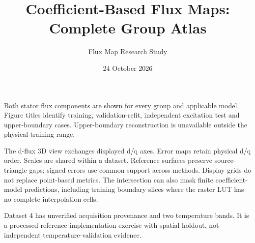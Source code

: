 \documentclass[11pt,a4paper]{article}
\title{Coefficient-Based Flux Maps: Complete Group Atlas}
\author{Flux Map Research Study}\date{24 October 2026}
\begin{document}
\maketitle
Both stator flux components are shown for every group and applicable model.
Figure titles identify training, validation-refit, independent excitation test and upper-boundary cases.
Upper-boundary reconstruction is unavailable outside the physical training range.
\par\medskip
The d-flux 3D view exchanges displayed d/q axes. Error maps retain physical d/q order.
Scales are shared within a dataset. Reference surfaces preserve source-triangle gaps;
signed errors use common support across methods. Display grids do not replace point-based metrics.
The intersection can also mask finite coefficient-model predictions, including training
boundary slices where the raster LUT has no complete interpolation cells.
\par\medskip
Dataset 4 has unverified acquisition provenance and two temperature bands. It is a processed-reference
implementation exercise with spatial holdout, not independent temperature-validation evidence.
\centering
\end{document}
